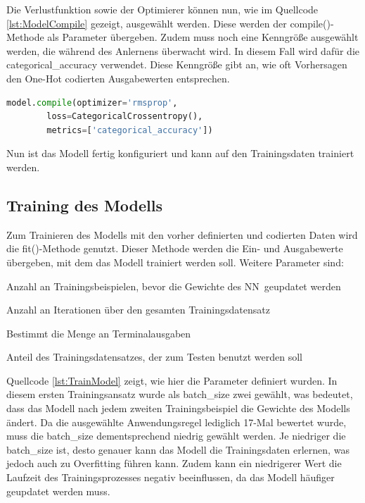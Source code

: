Die Verlustfunktion sowie der Optimierer können nun, wie im Quellcode \ref*{lst:ModelCompile} gezeigt, ausgewählt werden. Diese werden der compile()-Methode als Parameter übergeben.
Zudem muss noch eine Kenngröße ausgewählt werden, die während des Anlernens überwacht wird. In diesem Fall wird dafür die \glqq categorical\_accuracy\grqq{} verwendet.
Diese Kenngröße gibt an, wie oft Vorhersagen den One-Hot codierten Ausgabewerten entsprechen.

\begin{lstlisting}[language = python, caption={Auswahl des Optimierers sowie der Verlustfunktion},captionpos=b, label = lst:ModelCompile, float, floatplacement=H]
    model.compile(optimizer='rmsprop',
        loss=CategoricalCrossentropy(),
        metrics=['categorical_accuracy'])
\end{lstlisting}

Nun ist das Modell fertig konfiguriert und kann auf den Trainingsdaten trainiert werden.

\subsection{Training des Modells}
\label{chap:TrainNN}

Zum Trainieren des Modells mit den vorher definierten und codierten Daten wird die fit()-Methode genutzt. Dieser Methode werden die Ein- und Ausgabewerte übergeben, mit dem das Modell trainiert werden soll.
Weitere Parameter sind:
\begin{description}[style=multiline,leftmargin=3cm,font=\bfseries, nolistsep]
    \item[batch\_size] Anzahl an Trainingsbeispielen, bevor die Gewichte des \ac{NN}~geupdatet werden \cite{KerasDoc}
    \item[epochs] Anzahl an Iterationen über den gesamten Trainingsdatensatz \cite{KerasDoc}
    \item[verbose] Bestimmt die Menge an Terminalausgaben \cite{KerasDoc}
    \item[validation\_split] Anteil des Trainingsdatensatzes, der zum Testen benutzt werden soll \cite{KerasDoc}
\end{description} 
Quellcode \ref*{lst:TrainModel} zeigt, wie hier die Parameter definiert wurden. In diesem ersten Trainingsansatz wurde als \glqq batch\_size\grqq{} zwei gewählt, was bedeutet, dass das Modell
nach jedem zweiten Trainingsbeispiel die Gewichte des Modells ändert. Da die ausgewählte Anwendungsregel lediglich 17-Mal bewertet wurde, muss die \glqq batch\_size\grqq{} dementsprechend niedrig gewählt
werden. Je niedriger die \glqq batch\_size\grqq{} ist, desto genauer kann das Modell die Trainingsdaten erlernen, was jedoch auch zu Overfitting führen kann. Zudem kann ein niedrigerer Wert 
die Laufzeit des Trainingsprozesses negativ beeinflussen, da das Modell häufiger geupdatet werden muss.

